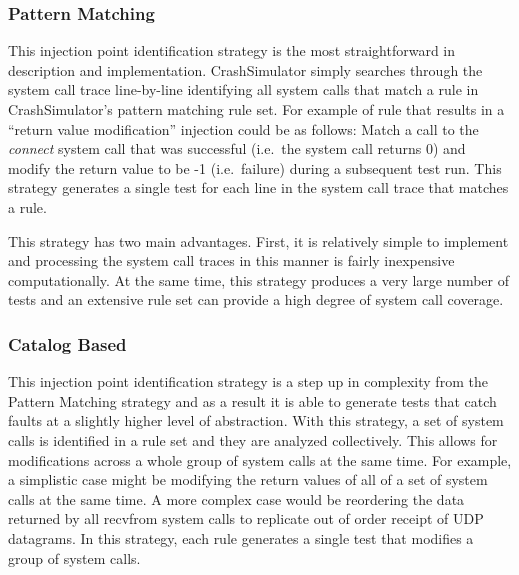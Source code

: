         \subsubsection{Pattern Matching}

            This injection point identification strategy is the most straightforward in description and implementation.
            CrashSimulator simply searches through the system call trace line-by-line identifying all system calls that
            match a rule in CrashSimulator's pattern matching rule set. For example of rule that results in a ``return
            value modification'' injection could be as follows: Match a call to the \emph{connect} system call that was
            successful (i.e.\ the system call returns 0) and modify the return value to be -1 (i.e.\ failure) during a
            subsequent test run. This strategy generates a single test for each line in the system call trace that
            matches a rule.

            This strategy has two main advantages. First, it is relatively simple to implement and processing the system
            call traces in this manner is fairly inexpensive computationally. At the same time, this strategy produces a
            very large number of tests and an extensive rule set can provide a high degree of system call coverage.

        \subsubsection{Catalog Based}

            This injection point identification strategy is a step up in complexity from the Pattern Matching strategy
            and as a result it is able to generate tests that catch faults at a slightly higher level of abstraction.
            With this strategy, a set of system calls is identified in a rule set and they are analyzed collectively.
            This allows for modifications across a whole group of system calls at the same time. For example, a
            simplistic case might be modifying the return values of all of a set of system calls at the same time. A
            more complex case would be reordering the data returned by all recvfrom system calls to replicate out of
            order receipt of UDP datagrams.  In this strategy, each rule generates a single test that modifies a group
            of system calls.

